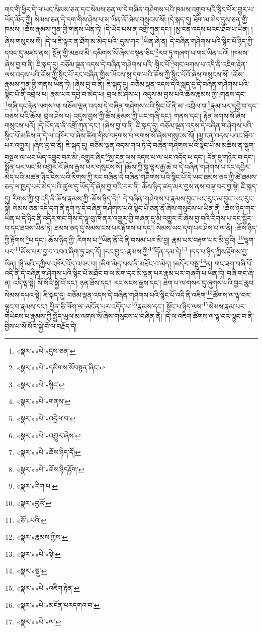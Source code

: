 གང་གི་ཕྱིར་དེ་ལ་ཡང་སེམས་ཅན་དང་སེམས་ཅན་ལ་དེ་བཞིན་གཤེགས་པའི་ཁམས་འགྲུབ་པའི་སྙིང་པོར་གྱུར་པ་ཡོད་མོད་ཀྱི། སེམས་ཅན་དེ་དག་གིས་ཤེས་པ་མ་ཡིན་ནོ་ཞེས་གསུངས་སོ། །དེ་སྐད་དུ། ཐོག་མ་མེད་དུས་ཅན་གྱི་ཁམས། །ཆོས་རྣམས་ཀུན་གྱི་གནས་ཡིན་ཏེ། །དེ་ཡོད་པས་ན་འགྲོ་ཀུན་དང་། །མྱ་ངན་འདས་པའང་ཐོབ་པ་ཡིན། །ཞེས་གསུངས་སོ། །དེ་ལ་ཇི་ལྟར་ན་ཐོག་མ་མེད་པའི་:དུས་གང་\footnote{«སྣར་»«པེ་»དུས་ཅན་}ཡིན་ཞེ་ན། དེ་བཞིན་གཤེགས་པའི་སྙིང་པོ་ཉིད་ཀྱི་དབང་དུ་མཛད་ནས། སྔོན་གྱི་མཐའ་མི་:དམིགས་སོ་ཞེས་བསྟན་ཅིང་\footnote{«སྣར་»«པེ་»དམིགས་སོབསྟན་ཞིང་}རབ་ཏུ་གཞག་པ་གང་ཡིན་པའོ། །ཁམས་ཞེས་བྱ་བ་ནི། ཇི་སྐད་དུ། བཅོམ་ལྡན་འདས་དེ་བཞིན་གཤེགས་པའི་:སྙིང་པོ་\footnote{«སྣར་»«པེ་»སྙིང་}གང་ལགས་པ་འདི་ནི་འཇིག་རྟེན་ལས་འདས་པའི་ཆོས་ཀྱི་སྙིང་པོ་རང་བཞིན་གྱིས་ཡོངས་སུ་དག་པའི་ཆོས་ཀྱི་སྙིང་པོའོ་ཞེས་གསུངས་སོ། །ཆོས་རྣམས་ཀུན་གྱི་གནས་ཡིན་ཏེ། །ཞེས་བྱ་བ་ནི། ཇི་སྐད་དུ། བཅོམ་ལྡན་འདས་དེའི་སླད་དུ་དེ་བཞིན་གཤེགས་པའི་སྙིང་པོ་ནི་འབྲེལ་པ། རྣམ་པར་དབྱེ་བ་མེད་པ། བྲལ་མི་ཤེས་པ། འདུས་མ་བྱས་པའི་ཆོས་རྣམས་ཀྱི་:གནས་དང་\footnote{«སྣར་»«པེ་»གནས་}གཞི་དང་རྟེན་ལགས་ལ། བཅོམ་ལྡན་འདས་དེ་བཞིན་གཤེགས་པའི་སྙིང་པོ་ནི་མ་:འབྲེལ་བ་\footnote{«སྣར་»«པེ་»འདྲེལ་བ་}རྣམ་པར་དབྱེ་བ་དང་བཅས་པའི་ཆོས། བྲལ་ཤེས་པ། འདུས་བྱས་ཀྱི་ཆོས་རྣམས་ཀྱི་ཡང་གཞི་དང་། གནས་དང་། རྟེན་ལགས་སོ་ཞེས་གསུངས་པའོ། །དེ་ཡོད་ན་ནི་འགྲོ་ཀུན་དང་། །ཞེས་བྱ་བ་ནི། ཇི་སྐད་དུ། བཅོམ་ལྡན་འདས་དེ་བཞིན་གཤེགས་པའི་སྙིང་པོ་མཆིས་ན་དེ་ལ་འཁོར་བ་ཞེས་ཚིག་གིས་བཏགས་པ་ལགས་སོ་ཞེས་གསུངས་སོ། །མྱ་ངན་འདས་པའང་ཐོབ་པར་འགྱུར། །ཞེས་བྱ་བ་ནི། ཇི་སྐད་དུ། བཅོམ་ལྡན་འདས་གལ་ཏེ་དེ་བཞིན་གཤེགས་པའི་སྙིང་པོ་མ་མཆིས་ན་སྡུག་བསྔལ་ལ་ཡང་ཡིད་འབྱུང་བར་མི་:འགྱུར་ཞིང་\footnote{«སྣར་»«པེ་»འགྱུར་ཞེས་}མྱ་ངན་ལས་འདས་པ་ལ་ཡང་འདོད་པ་དང་། དོན་དུ་གཉེར་བ་དང་། སྨོན་པར་ཡང་མི་འགྱུར་རོ་ཞེས་རྒྱས་པར་གསུངས་སོ། །ཆོས་ཀྱི་སྐུ་ལྟར་རྒྱ་ཆེ་བ་དེ་བཞིན་གཤེགས་པ་དང་དབྱེར་མེད་པའི་མཚན་ཉིད་ངེས་པའི་རིགས་ཀྱི་རང་བཞིན་དེ་བཞིན་གཤེགས་པའི་སྙིང་པོ་དེ་ཡང་ཐམས་ཅད་ཀྱི་ཚེ་ཐམས་ཅད་ལ་ཁྱད་པར་མེད་པའི་ཚུལ་དུ་ཡོད་དོ་ཞེས་བྱ་བའི་བར་ནི། ཆོས་ཉིད་ཚད་མར་བྱས་ནས་བལྟ་བར་བྱ་སྟེ། ཇི་སྐད་དུ། རིགས་ཀྱི་བུ་འདི་ནི་ཆོས་རྣམས་ཀྱི་:ཆོས་ཉིད་དེ།\footnote{«སྣར་»«པེ་»ཆོས་ཉིད་དོ།} དེ་བཞིན་གཤེགས་པ་རྣམས་བྱུང་ཡང་རུང་མ་བྱུང་ཡང་རུང་སྟེ། སེམས་ཅན་འདི་དག་ནི་རྟག་ཏུ་དེ་བཞིན་གཤེགས་པའི་སྙིང་པོ་ཅན་ནོ་ཞེས་གསུངས་པ་ཡིན་ནོ། །ཆོས་ཉིད་གང་ཡིན་པ་དེ་ཉིད་ནི་འདིར་གང་གིས་དེ་ལྟ་བུ་ཁོ་ནར་འགྱུར་གྱི་གཞན་དུ་མི་འགྱུར་རོ་ཞེས་བྱ་བའི་རིགས་པ་དང་སྦྱོར་བ་དང་ཐབས་ཡིན་ཏེ། ཐམས་ཅད་དུ་སེམས་ངས་པར་རྟོགས་པ་དང་། སེམས་ཡང་དག་པར་ཤེས་པ་ལ་ནི། :ཆོས་ཉིད་ཀྱི་རྟོགས་\footnote{«སྣར་»«པེ་»ཆོས་ཉིདརྟོག་}པ་དང་། ཆོས་ཉིད་ཀྱི་:རིགས་པ་\footnote{«སྣར་»རིག་པ་}ཡིན་ནོ་དེ་ནི་བསམ་པར་མི་བྱ། རྣམ་པར་བརྟག་པར་མི་བྱའི། \footnote{«སྣར་»བྱའོ་}ལྷག་པར་\footnote{«ཅོ་»པའི་}མོས་པར་བྱ་བ་འབའ་ཞིག་ཏུ་ཟད་དོ། །རང་བྱུང་:རྣམས་ཀྱི་\footnote{«སྣར་»རྣམས་ཀྱིས་}དོན་དམ་དེ།\footnote{«སྣར་»«པེ་»སྟེ།} །དད་པ་ཉིད་ཀྱིས་རྟོགས་བྱ་ཡིན། །ཉི་མའི་དཀྱིལ་འཁོར་འོད་འབར་བ། །མིག་མེད་པས་ནི་མཐོང་བ་མེད། །མདོར་བསྡུ་\footnote{«སྣར་»སྡུ་}ན། གང་ཟག་བཞི་པོ་འདི་ནི་དེ་བཞིན་གཤེགས་པའི་སྙིང་པོ་མཐོང་བ་ལ་མིག་དང་མི་ལྡན་པར་རྣམ་པར་གཞག་པ་ཡིན་ཏེ། བཞི་གང་ཞེ་ན། འདི་ལྟ་སྟེ། སོ་སོའི་སྐྱེ་བོ་དང་། ཉན་ཐོས་དང་། རང་སངས་རྒྱས་དང་། ཐེག་པ་ལ་གསར་དུ་ཞུགས་པའི་བྱང་ཆུབ་སེམས་དཔའ་སྟེ། ཇི་སྐད་དུ། བཅོམ་ལྡན་འདས་དེ་བཞིན་གཤེགས་པའི་སྙིང་པོ་འདི་ནི་འཇིག་\footnote{«སྣར་»«པེ་»འཇིག་རྟེན་}ཚོགས་ལ་ལྟ་བར་ལྷུང་བ་རྣམས་དང་། ཕྱིན་ཅི་ལོག་ལ་:མངོན་པར་འདོད་པ་\footnote{«སྣར་»«པེ་»མངོན་པརདགའ་བ་}རྣམས་དང་། སྟོང་པ་ཉིད་ལས་\footnote{«སྣར་»«པེ་»ལ་}སེམས་རྣམ་པར་གཡེངས་པ་རྣམས་ཀྱི་སྤྱོད་ཡུལ་མ་ལགས་སོ་ཞེས་གསུངས་པ་བཞིན་ནོ། །དེ་ལ་འཇིག་ཚོགས་ལ་ལྟ་བར་ལྷུང་བ་ནི་བྱིས་པ་སོ་སོའི་སྐྱེ་བོ་ལ་བརྗོད་དེ། 